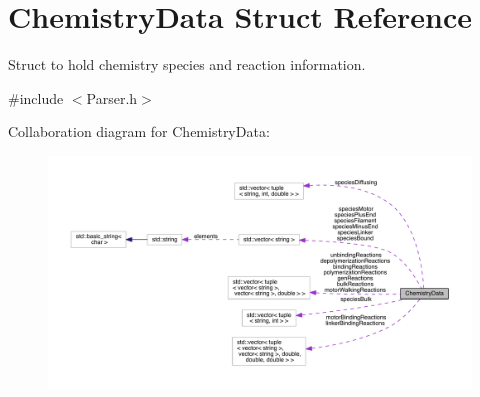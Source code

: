 \hypertarget{structChemistryData}{\section{Chemistry\+Data Struct Reference}
\label{structChemistryData}
}


Struct to hold chemistry species and reaction information.  




{\ttfamily \#include $<$Parser.\+h$>$}



Collaboration diagram for Chemistry\+Data\+:\nopagebreak
\begin{figure}[H]
\begin{center}
\leavevmode
\includegraphics[width=350pt]{structChemistryData__coll__graph}
\end{center}
\end{figure}

